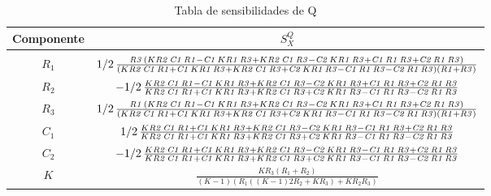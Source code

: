 \begin{table}[H]
\centering
\begin{tabular}{cc}
\hline
Componente & $S_X^{Q}$ \\ \hline\\
$R_1$  & $1/2\,{\frac {{\it R3}\, \left( K{\it R2}\,{\it C1}\,{\it R1}-{\it C1}
\,K{\it R1}\,{\it R3}+K{\it R2}\,{\it C1}\,{\it R3}-{\it C2}\,K{\it R1
}\,{\it R3}+{\it C1}\,{\it R1}\,{\it R3}+{\it C2}\,{\it R1}\,{\it R3}
 \right) }{ \left( K{\it R2}\,{\it C1}\,{\it R1}+{\it C1}\,K{\it R1}\,
{\it R3}+K{\it R2}\,{\it C1}\,{\it R3}+{\it C2}\,K{\it R1}\,{\it R3}-{
\it C1}\,{\it R1}\,{\it R3}-{\it C2}\,{\it R1}\,{\it R3} \right) 
 \left( {\it R1}+{\it R3} \right) }}$ \\
$R_2$  & $-1/2\,{\frac {K{\it R2}\,{\it C1}\,{\it R1}-{\it C1}\,K{\it R1}\,{\it 
R3}+K{\it R2}\,{\it C1}\,{\it R3}-{\it C2}\,K{\it R1}\,{\it R3}+{\it 
C1}\,{\it R1}\,{\it R3}+{\it C2}\,{\it R1}\,{\it R3}}{K{\it R2}\,{\it 
C1}\,{\it R1}+{\it C1}\,K{\it R1}\,{\it R3}+K{\it R2}\,{\it C1}\,{\it 
R3}+{\it C2}\,K{\it R1}\,{\it R3}-{\it C1}\,{\it R1}\,{\it R3}-{\it C2
}\,{\it R1}\,{\it R3}}}$ \\
$R_3$  & $1/2\,{\frac {{\it R1}\, \left( K{\it R2}\,{\it C1}\,{\it R1}-{\it C1}
\,K{\it R1}\,{\it R3}+K{\it R2}\,{\it C1}\,{\it R3}-{\it C2}\,K{\it R1
}\,{\it R3}+{\it C1}\,{\it R1}\,{\it R3}+{\it C2}\,{\it R1}\,{\it R3}
 \right) }{ \left( K{\it R2}\,{\it C1}\,{\it R1}+{\it C1}\,K{\it R1}\,
{\it R3}+K{\it R2}\,{\it C1}\,{\it R3}+{\it C2}\,K{\it R1}\,{\it R3}-{
\it C1}\,{\it R1}\,{\it R3}-{\it C2}\,{\it R1}\,{\it R3} \right) 
 \left( {\it R1}+{\it R3} \right) }}$ \\
 $C_1$  & $1/2\,{\frac {K{\it R2}\,{\it C1}\,{\it R1}+{\it C1}\,K{\it R1}\,{\it 
R3}+K{\it R2}\,{\it C1}\,{\it R3}-{\it C2}\,K{\it R1}\,{\it R3}-{\it 
C1}\,{\it R1}\,{\it R3}+{\it C2}\,{\it R1}\,{\it R3}}{K{\it R2}\,{\it 
C1}\,{\it R1}+{\it C1}\,K{\it R1}\,{\it R3}+K{\it R2}\,{\it C1}\,{\it 
R3}+{\it C2}\,K{\it R1}\,{\it R3}-{\it C1}\,{\it R1}\,{\it R3}-{\it C2
}\,{\it R1}\,{\it R3}}}$ \\
$C_2$  & $-1/2\,{\frac {K{\it R2}\,{\it C1}\,{\it R1}+{\it C1}\,K{\it R1}\,{\it 
R3}+K{\it R2}\,{\it C1}\,{\it R3}-{\it C2}\,K{\it R1}\,{\it R3}-{\it 
C1}\,{\it R1}\,{\it R3}+{\it C2}\,{\it R1}\,{\it R3}}{K{\it R2}\,{\it 
C1}\,{\it R1}+{\it C1}\,K{\it R1}\,{\it R3}+K{\it R2}\,{\it C1}\,{\it 
R3}+{\it C2}\,K{\it R1}\,{\it R3}-{\it C1}\,{\it R1}\,{\it R3}-{\it C2
}\,{\it R1}\,{\it R3}}}$ \\
$K$  &$\frac{KR_3(R_1+R_2)}{(K-1)(R_1((K-1)2R_2+KR_3)+KR_2R_3)}$ \\    
\hline
\end{tabular}
\caption{Tabla de sensibilidades de Q}
\label{tab:SENS_Q}
\end{table}

